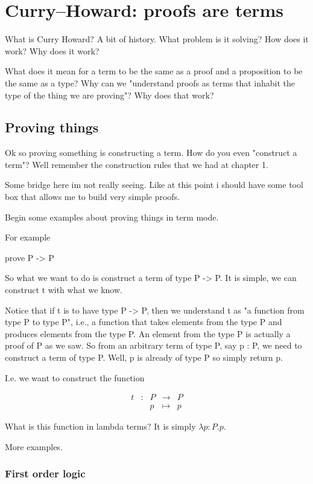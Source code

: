 \chapter{Curry--Howard: proofs are terms}

What is Curry Howard? A bit of history. What problem is it solving? How does it work? Why does it work?

What does it mean for a term to be the same as a proof and a proposition to be the same as a type? Why can we "understand proofs as terms that inhabit the type of the thing we are proving"? Why does that work?

\section{Proving things}

Ok so proving something is constructing a term. How do you even "construct a term"? Well remember the construction rules that we had at chapter 1.

Some bridge here im not really seeing. Like at this point i should have some tool box that allows me to build very simple proofs.

Begin some examples about proving things in term mode.

For example

prove P -> P 


So what we want to do is construct a term of type P -> P. It is simple, we can construct t with what we know.

Notice that if t is to have type P -> P, then we understand t as "a function from type P to type P", i.e., a function that takes elements from the type P and produces elements from the type P. An element from the type P is actually a proof of P as we saw. So from an arbitrary term of type P, say p : P, we need to construct a term of type P. Well, p is already of type P so simply return p.

I.e. we want to construct the function

$$
\begin{array}{ccrcl}
  t & : & P  &\longrightarrow  & P \\
  & & p & \longmapsto & p
\end{array}
$$

What is this function in lambda terms? It is simply $\lambda p : P . p$.

More examples.

\subsection{First order logic}

